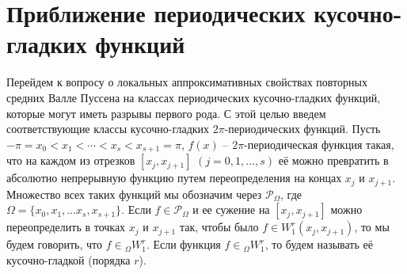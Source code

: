 %
%





\section{Приближение периодических кусочно-гладких  функций}


Перейдем к вопросу о локальных  аппроксимативных свойствах повторных средних Валле Пуссена на классах периодических кусочно-гладких функций, которые могут иметь разрывы первого рода.
С этой целью введем соответствующие классы кусочно-гладких $2\pi$-периодических функций.
Пусть $-\pi=x_0<x_1<\cdots<x_s<x_{s+1}=\pi$,
$f(x)$ -- $2\pi$-периодическая функция такая, что на каждом из отрезков $[x_j,x_{j+1}]$ $(j=0,1,\ldots,s)$ её можно превратить в абсолютно непрерывную функцию путем переопределения на концах $x_j$ и $x_{j+1}$. Множество всех таких функций мы обозначим  через $\mathcal{ P}_\Omega$, где $\Omega=\{x_0,x_1,\ldots x_s,x_{s+1}\}$.
Если $f\in \mathcal{  P}_\Omega$ и ее сужение на $[x_j,x_{j+1}]$ можно переопределить в точках
$x_j$ и $x_{j+1}$ так, чтобы было $f\in W_1^r(x_j,x_{j+1})$, то мы будем говорить, что $f\in {}_\Omega W_1^r$. Если функция $f\in{}_\Omega W_1^r$, то будем называть её кусочно-гладкой (порядка $r$).




